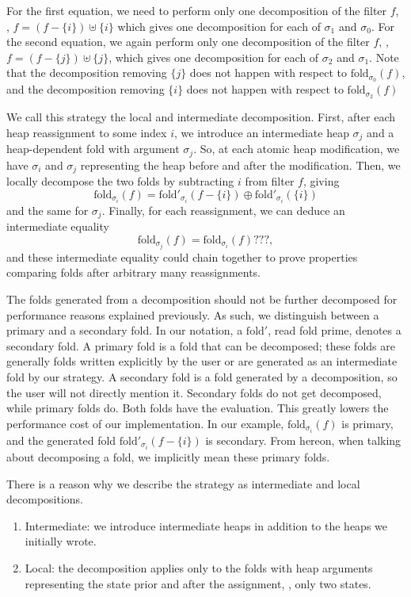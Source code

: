 \documentclass[msc,oneside]{ubcthesis}
\begin{document}
For the first equation, we need to perform only one decomposition of the filter $f$, \ie, $f = (f - \{i\}) \uplus \{i\}$ which gives one decomposition for each of $\sigma_1$ and $\sigma_0$. For the second equation, we again perform only one decomposition of the filter $f$, \ie, $f = (f - \{j\}) \uplus \{j\}$, which gives one decomposition for each of $\sigma_2$ and $\sigma_1$. Note that the decomposition removing $\{j\}$ does not happen with respect to $\textrm{fold}_{\sigma_0}(f)$, and the decomposition removing $\{i\}$ does not happen with respect to $\textrm{fold}_{\sigma_2}(f)$

We call this strategy the local and intermediate decomposition. First, after each heap reassignment to some index $i$, we introduce an intermediate heap $\sigma_j$ and a heap-dependent fold with argument $\sigma_j$. So, at each atomic heap modification, we have $\sigma_i$ and $\sigma_j$ representing the heap before and after the modification. Then, we locally decompose the two folds by subtracting $i$ from filter $f$, giving $$\textrm{fold}_{\sigma_i}(f) = \textrm{fold}'_{\sigma_i}(f - \{i\}) \oplus \textrm{fold}'_{\sigma_i}(\{i\})$$ and the same for $\sigma_j$.
Finally, for each reassignment, we can deduce an intermediate equality 
$$ \textrm{fold}_{\sigma_j}(f) = \textrm{fold}_{\sigma_i}(f) ???,$$ and these intermediate equality could chain together to prove properties comparing folds after arbitrary many reassignments. 

The folds generated from a decomposition should not be further decomposed for performance reasons explained previously. As such, we distinguish between a primary and a secondary fold. In our notation, a $\textrm{fold}'$, read fold prime, denotes a secondary fold. A primary fold is a fold that can be decomposed; these folds are generally folds written explicitly by the user or are generated as an intermediate fold by our strategy. A secondary fold is a fold generated by a decomposition, so the user will not directly mention it. Secondary folds do not get decomposed, while primary folds do. Both folds have the evaluation. This greatly lowers the performance cost of our implementation. In our example, $\textrm{fold}_{\sigma_i}(f)$ is primary, and the generated fold $\textrm{fold}'_{\sigma_i}(f - \{i\})$ is secondary. From hereon, when talking about decomposing a fold, we implicitly mean these primary folds.

There is a reason why we describe the strategy as intermediate and local decompositions.
\begin{enumerate}
    \item Intermediate: we introduce intermediate heaps in addition to the heaps we initially wrote.
    \item Local: the decomposition applies only to the folds with heap arguments representing the state prior and after the assignment, \ie, only two states. 
\end{enumerate}
\end{document}

